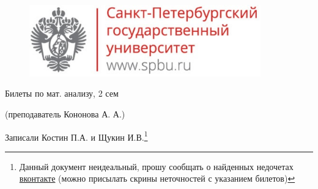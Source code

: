 \documentclass[11pt, fleqn]{article}
\begin{document}
  \begin{figure}[H]
      \includegraphics[width=10cm]{../../../template/spsu.jpg}
      \centering
  \end{figure}
  \begin{center}
    \huge Билеты по мат. анализу, 2 сем

    \Large (преподаватель Кононова А. А.)

    \large Записали Костин П.А. и Щукин И.В.\footnote{Данный документ неидеальный, прошу сообщать о найденных недочетах \href{https://vk.com/drab_existence_a}{вконтакте} (можно присылать скрины неточностей с указанием билетов)}
  \end{center}

  \newpage
  \tableofcontents
  \newpage

  

  

  

  

  

  

  
\end{document}
